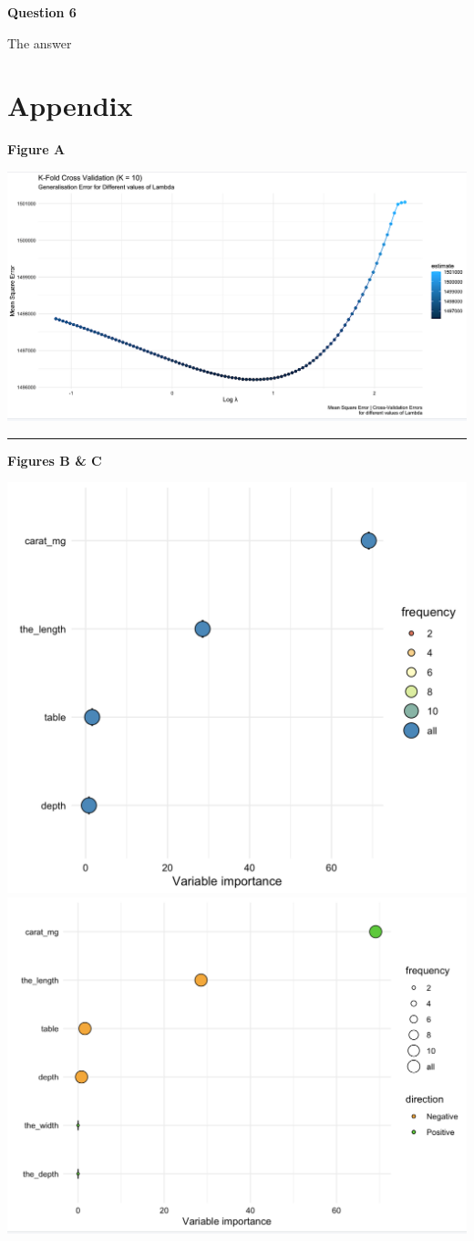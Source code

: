 \documentclass[
]{article}
\begin{document}
\textbf{Question 6}

The answer

\newpage

\hypertarget{appendix}{%
\section{Appendix}\label{appendix}}

\textbf{Figure A}

\begin{center}\includegraphics[width=0.8\linewidth]{Images/Generalisation_Error} \end{center}

\begin{center}\rule{0.5\linewidth}{0.5pt}\end{center}

\textbf{Figures B \& C}

\includegraphics[width=0.55\linewidth]{Images/Variable_Importance}
\includegraphics[width=0.55\linewidth]{Images/Vaariable_Importance2}
\end{document}
